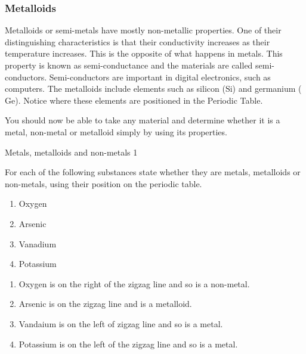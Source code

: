             \subsubsection{ Metalloids}
            \nopagebreak
        \label{m38708*id66042}Metalloids or semi-metals have mostly non-metallic properties. One of their distinguishing characteristics is that their conductivity increases as their temperature increases. This is the opposite of what happens in metals. This property is known as semi-conductance and the materials are called semi-conductors. Semi-conductors are important in digital electronics, such as computers. The metalloids include elements such as silicon ($\mathrm{Si}$) and germanium ($\mathrm{Ge}$). Notice where these elements are positioned in the Periodic Table.\par 
      \label{m38708*eip-690}You should now be able to take any material and determine whether it is a metal, non-metal or metalloid simply by using its properties. \par \label{m38708*eip-586}\vspace{.5cm} 
      \noindent
      \begin{wex}{Metals, metalloids and non-metals 1}{\label{m38708*eip-77}
  \label{m38708*eip-252}
For each of the following substances state whether they are metals, metalloids or non-metals, using their position on the periodic table.
\label{m38708*eip-id1170734629720}
\begin{enumerate}[noitemsep, label=\textbf{\alph*}. ] 
            \leftskip=20pt\rightskip=\leftskip
\item Oxygen
\item Arsenic
\item Vanadium
\item Potassium
\end{enumerate}
  \par }
{\vspace{5pt}
{} 
\begin{enumerate}
\item Oxygen is on the right of the zigzag line and so is a non-metal.
\item Arsenic is on the zigzag line and is a metalloid.
\item Vandaium is on the left of zigzag line and so is a metal.
\item Potassium is on the left of the zigzag line and so is a metal.\end{enumerate}
}
    \end{wex}
